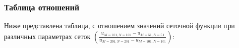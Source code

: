 \documentclass[a4paper,12pt]{article}
\begin{document}

\subsubsection*{Таблица отношений}
Ниже представлена таблица, с отношением значений сеточной функции при различных параметрах сеток \(\left(\frac{u_{M=101,N=101}-u_{M=51,N=51}}{u_{M=201,N=201}-u_{M=101,N=101}}\right)\):


\end{document}
